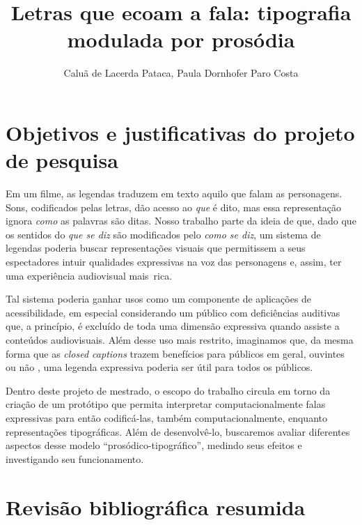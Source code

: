 \documentclass[a4paper]{tufte-handout}
\title{Letras que ecoam a fala: tipografia modulada por prosódia}
\author{Caluã de Lacerda Pataca, Paula Dornhofer Paro Costa}
\date{}  %
\begin{document}
\maketitle%



\section{Objetivos e justificativas do projeto de pesquisa}\label{sec:objetivos}

Em um filme, as legendas traduzem em texto aquilo que falam as personagens. Sons, codificados pelas letras, dão acesso ao \textit{que} é dito, mas essa representação ignora \textit{como} as palavras são ditas. Nosso trabalho parte da ideia de que, dado que os sentidos do \textit{que se diz} são modificados pelo \textit{como se diz}, um sistema de legendas poderia buscar representações visuais que permitissem a seus espectadores intuir qualidades expressivas na voz das personagens e, assim, ter uma experiência audiovisual mais~rica.

Tal sistema poderia ganhar usos como um componente de aplicações de acessibilidade, em especial considerando um público com deficiências auditivas que, a princípio, é excluído de toda uma dimensão expressiva quando assiste a conteúdos audiovisuais. Além desse uso mais restrito, imaginamos que, da mesma forma que as \textit{closed captions} trazem benefícios para públicos em geral, ouvintes ou não \citep{fiske_video_2015}, uma legenda expressiva poderia ser útil para todos os públicos.

Dentro deste projeto de mestrado, o escopo do trabalho circula em torno da criação de um protótipo que permita interpretar computacionalmente falas expressivas para então codificá-las, também computacionalmente, enquanto representações tipográficas. Além de desenvolvê-lo, buscaremos avaliar diferentes aspectos desse modelo ``prosódico-tipográfico'', medindo seus efeitos e investigando seu funcionamento.

\section{Revisão bibliográfica resumida}\label{sec:revisao_bibliografica}
\end{document}
